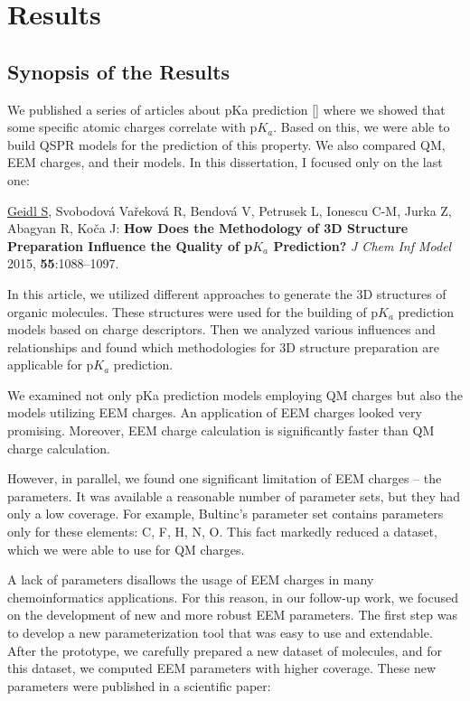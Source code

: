 \part{Results}
\label{part:results}

\chapter{Synopsis of the Results}

We published a series of articles about pKa prediction [] where we showed that
some specific atomic charges correlate with p$K_a$. Based on this, we were able
to build QSPR models for the prediction of this property. We also compared QM,
EEM charges, and their models.  In this dissertation, I focused only
on the last one:

\underline{Geidl S}, Svobodová Vařeková R, Bendová V, Petrusek L, Ionescu C-M,
Jurka Z, Abagyan R, Koča J: \textbf{How Does the Methodology of 3D Structure
Preparation Influence the Quality of p$K_a$ Prediction?} \textit{J Chem Inf Model}
2015, \textbf{55}:1088–1097.

In this article, we utilized different approaches to generate the 3D structures
of organic molecules. These structures were used for the building of p$K_a$
prediction models based on charge descriptors. Then we analyzed various
influences and relationships and found which methodologies for 3D structure
preparation are applicable for p$K_a$ prediction. 

We examined not only pKa prediction models employing QM charges but also the
models utilizing EEM charges. An application of EEM charges looked very
promising. Moreover, EEM charge calculation is significantly faster than
QM charge calculation. 

However, in parallel, we found one significant limitation of EEM charges -- the
parameters. It was available a reasonable number of parameter sets, but they
had only a low coverage.  For example, Bultinc's parameter
set \cite{Bultinck2002} contains parameters only for these elements: C, F, H, N,
O. This fact markedly reduced a dataset, which we were able to use for QM
charges. 

A lack of parameters disallows the usage of EEM charges in many chemoinformatics
applications. For this reason, in our follow-up work, we focused
on the development of new and more robust EEM parameters. The first step was to
develop a new parameterization tool that was easy to use and extendable.
After the prototype, we carefully prepared a new dataset of molecules, and
for this dataset, we computed EEM parameters with higher coverage. These new
parameters were published in a scientific paper:

